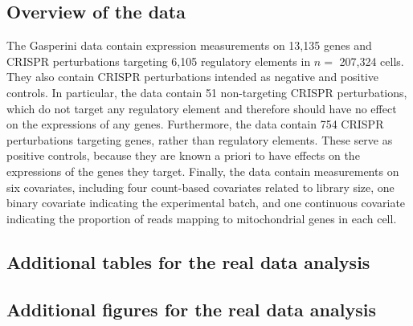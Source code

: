 \documentclass[12pt]{article}
\theoremstyle{definition}
\begin{document}
\subsection{Overview of the data}\label{sec:additional-details-real-data}

The Gasperini data contain expression measurements on 13,135 genes and CRISPR perturbations targeting 6,105 regulatory elements in $n =$ 207,324 cells. They also contain CRISPR perturbations intended as negative and positive controls. In particular, the data contain 51 non-targeting CRISPR perturbations, which do not target any regulatory element and therefore should have no effect on the expressions of any genes. Furthermore, the data contain 754 CRISPR perturbations targeting genes, rather than regulatory elements. These serve as positive controls, because they are known a priori to have effects on the expressions of the genes they target. Finally, the data contain measurements on six covariates, including four count-based covariates related to library size, one binary covariate indicating the experimental batch, and one continuous covariate indicating the proportion of reads mapping to mitochondrial genes in each cell.


\subsection{Additional tables for the real data analysis}\label{sec:additional_table_realdata}




\subsection{Additional figures for the real data analysis}\label{sec:additional_figure_realdata}
\end{document}
